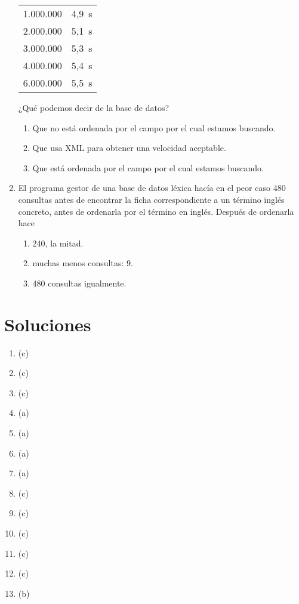 \begin{enumerate}
\begin{center}
\begin{tabular}{c|c}
1.000.000 &4,9~s \\ 2.000.000 &5,1~s \\ 3.000.000 &5,3~s \\ 4.000.000 &5,4~s \\ 6.000.000 &5,5~s \\ \hline

\end{tabular} \end{center} ¿Qué podemos decir de la base de datos? \begin{enumerate} \item Que no está ordenada por el campo por el cual estamos buscando. \item Que usa XML para obtener una velocidad aceptable. \item Que está ordenada por el campo por el cual estamos buscando. \end{enumerate} 

\item El programa gestor de una base de datos léxica hacía en el peor caso 480 consultas antes de encontrar la ficha correspondiente a un término inglés concreto, antes de ordenarla por el término en inglés. Después de ordenarla hace \begin{enumerate} \item 240, la mitad. \item muchas menos consultas: 9. \item 480 consultas igualmente. \end{enumerate} \end{enumerate} 

\section{Soluciones}  \begin{enumerate} \item (c) \item (c) \item (c) \item (a) \item (a) 

\item (a) \item (a) \item (c) \item (c) \item (c) 

\item (c) \item (c) \item (b) \end{enumerate} 
